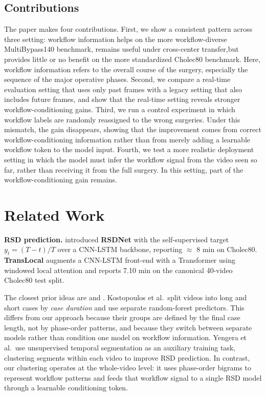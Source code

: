 \subsection{Contributions}\label{our-contributions}
The paper makes four contributions. First, we show a consistent pattern across three setting: workflow information helps on the more workflow-diverse MultiBypass140 benchmark, remains useful under cross-center transfer,but provides little or no benefit on the more standardized Cholec80 benchmark. Here, workflow information refers to the overall course of the surgery, especially the sequence of the major operative phases. Second, we compare a real-time evaluation setting that uses only past frames with a legacy setting that also includes future frames, and show that the real-time setting reveals stronger workflow-conditioning gains. Third, we run a control experiment in which workflow labels are randomly reassigned to the wrong surgeries. Under this mismatch, the gain disappears, showing that the improvement comes from correct workflow-conditioning information rather than from merely adding a learnable workflow token to the model input. Fourth, we test a more realistic deployment setting in which the model must infer the workflow signal from the video seen so far, rather than receiving it from the full surgery. In this setting, part of the workflow-conditioning gain remains.

\section{Related Work}\label{related-work}

\textbf{RSD prediction.} \citet{twinanda2019rsdnet} introduced
\textbf{RSDNet} with the self-supervised target \(y_t = (T - t) / T\)
over a CNN-LSTM backbone, reporting $\approx$ 8 min on Cholec80.
\textbf{TransLocal} \citep{loukas2024translocal} augments a CNN-LSTM front-end
with a Transformer using windowed local attention and reports 7.10 min
on the canonical 40-video Cholec80 test split.

The closest prior ideas are \textbf{\citet{kostopoulos2025prediction}} and \textbf{\citet{yengera2019unsupervised}}. Kostopoulos et al.~split videos into long and short cases by \emph{case duration} and use separate random-forest predictors. This differs from our approach because their groups are defined by the
final case length, not by phase-order patterns, and because they switch
between separate models rather than condition one model on workflow
information. Yengera et al.~use unsupervised temporal segmentation as an auxiliary
training task, clustering segments within each video to improve RSD
prediction. In contrast, our clustering operates at the whole-video
level: it uses phase-order bigrams to represent workflow patterns and
feeds that workflow signal to a single RSD model through a learnable
conditioning token.

